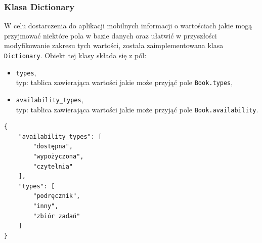 \documentclass[twoside]{projektInzynierskiMS}
\begin{document}
\subsubsection{Klasa Dictionary}
W celu dostarczenia do aplikacji mobilnych informacji o wartościach jakie mogą przyjmować niektóre pola w bazie danych oraz ułatwić w przyszłości modyfikowanie zakresu tych wartości, została zaimplementowana klasa \verb`Dictionary`. Obiekt tej klasy składa się z pól:
\begin{itemize}
	\item \verb`types`, \\
	typ: tablica zawierająca wartości jakie może przyjąć pole \verb`Book.types`,
	\item \verb`availability_types`, \\
	typ: tablica zawierająca wartości jakie może przyjąć pole \verb`Book.availability`.
\end{itemize}


\begin{verbatim}
{
    "availability_types": [
        "dostępna",
        "wypożyczona",
        "czytelnia"
    ],
    "types": [
        "podręcznik",
        "inny",
        "zbiór zadań"
    ]
}
\end{verbatim}
\end{document}
